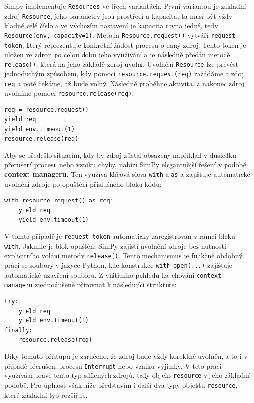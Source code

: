 \documentclass[
  program=itp,
  biblatex,
  figures=false,
  glossaries,
  index
]{kidiplom}
\begin{document}
Simpy implementuje \texttt{Resources} ve třech variantách. První variantou je základní zdroj \texttt{Resource}, jeho parametry jsou prostředí a kapacita, ta musí být vždy kladné celé číslo a ve výchozím nastavení je kapacita rovna jedné, tedy \texttt{Resource(env, capacity=1)}. Metoda \texttt{Resource.request()} vytváří \texttt{request token}, který reprezentuje konkrétní žádost procesu o daný zdroj. Tento token je uložen ve zdroji po celou dobu jeho využívání a je následně předán metodě \texttt{release()}, která na jeho základě zdroj uvolní.  Uvolnění \texttt{Resource} lze provést jednoduchým způsobem, kdy pomocí \texttt{resource.request(req)} zažádáme o zdoj \texttt{req} a poté čekáme, až bude volný. Následně proběhne aktivita, a nakonec zdroj uvolníme pomocí \texttt{resource.release(req)}.

\begin{verbatim}
req = resource.request()  
yield req              
yield env.timeout(1)
resource.release(req)      
\end{verbatim}

Aby se předešlo situacím, kdy by zdroj zůstal obsazený například v důsledku přerušení procesu nebo vzniku chyby, nabízí SimPy elegantnější řešení v podobě \textbf{context manageru}. Ten využívá klíčová slova \texttt{with} a \texttt{as} a zajišťuje automatické uvolnění zdroje po opuštění příslušného bloku kódu:

\begin{verbatim}
with resource.request() as req:
    yield req              
    yield env.timeout(1)
\end{verbatim}

V tomto případě je \texttt{request token} automaticky zaregistrován v rámci bloku \texttt{with}. Jakmile je blok opuštěn, SimPy zajistí uvolnění zdroje bez nutnosti explicitního volání metody \texttt{release()}. Tento mechanismus je funkčně obdobný práci se soubory v jazyce Python, kde konstrukce \texttt{with open(...)} zajišťuje automatické uzavření souboru. Z vnitřního pohledu lze chování \texttt{context manageru} zjednodušeně přirovnat k následující struktuře:

\begin{verbatim}
try:
    yield req
    yield env.timeout(1)
finally:
    resource.release(req)
\end{verbatim}

Díky tomuto přístupu je zaručeno, že zdroj bude vždy korektně uvolněn, a to i v případě přerušení procesu \texttt{Interrupt} nebo vzniku výjimky.  V této práci využívám právě tento typ sdílených zdrojů, tedy objekt \texttt{resource} v jeho základní podobě. Pro úplnost však níže představím i další dva typy objektu \texttt{resource}, které základní typ rozšiřují.
\end{document}
